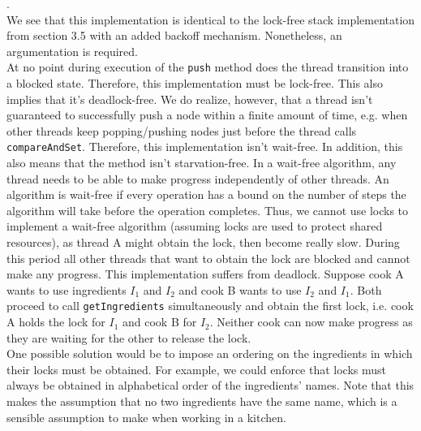 \documentclass[main]{subfiles}
\begin{document}
\begin{ExerciseList}
        \Answer[ref={PC}].\quad \\
            \Question We see that this implementation is identical to the lock-free stack implementation from section 3.5 with an added backoff mechanism. Nonetheless, an argumentation is required. \\[3mm]
            At no point during execution of the \texttt{push} method does the thread transition into a blocked state. Therefore, this implementation must be lock-free. This also implies that it's deadlock-free. We do realize, however, that a thread isn't guaranteed to successfully push a node within a finite amount of time, e.g. when other threads keep popping/pushing nodes just before the thread calls \texttt{compareAndSet}. Therefore, this implementation isn't wait-free. In addition, this also means that the method isn't starvation-free.
            \Question In a wait-free algorithm, any thread needs to be able to make progress independently of other threads. An algorithm is wait-free if every operation has a bound on the number of steps the algorithm will take before the operation completes. Thus, we cannot use locks to implement a wait-free algorithm (assuming locks are used to protect shared resources), as thread A might obtain the lock, then become really slow. During this period all other threads that want to obtain the lock are blocked and cannot make any progress.
            \Question This implementation suffers from deadlock. Suppose cook A wants to use ingredients $I_1$ and $I_2$ and cook B wants to use $I_2$ and $I_1$. Both proceed to call \texttt{getIngredients} simultaneously and obtain the first lock, i.e. cook A holds the lock for $I_1$ and cook B for $I_2$. Neither cook can now make progress as they are waiting for the other to release the lock.\\[3mm]
            One possible solution would be to impose an ordering on the ingredients in which their locks must be obtained. For example, we could enforce that locks must always be obtained in alphabetical order of the ingredients' names. Note that this makes the assumption that no two ingredients have the same name, which is a sensible assumption to make when working in a kitchen.
        \pagebreak
            

\end{ExerciseList}
\end{document}

